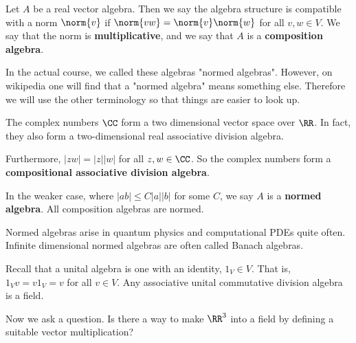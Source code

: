 \begin{defn}
    Let $A$ be a real vector algebra. Then we say the algebra structure is compatible with a norm $\norm{v}$ if  $\norm{vw}=\norm{v}\norm{w}$ for all $v,w\in V$. We say that the norm is \textbf{multiplicative}, and we say that $A$ is a \textbf{composition algebra}.
\end{defn}
\begin{remark*}
    In the actual course, we called these algebras "normed algebras". However, on wikipedia one will find that a "normed algebra" means something else. Therefore we will use the other terminology so that things are easier to look up.
\end{remark*}
\begin{example}
    The complex numbers $\CC$ form a two dimensional vector space over $\RR$. In fact, they also form a two-dimensional real associative division algebra.

    Furthermore, $|zw| = |z||w|$ for all $z,w\in \CC$. So the complex numbers form a \textbf{compositional associative division algebra}.
\end{example}
\begin{remark*}
    In the weaker case, where $|ab| \leq C|a||b|$ for some $C$, we say $A$ is a \textbf{normed algebra}. All composition algebras are normed.
\end{remark*}
\begin{physics*}
Normed algebras arise in quantum physics and computational PDEs quite often. Infinite dimensional normed algebras are often called Banach algebras.
\end{physics*}
\begin{remark*}
Recall that a unital algebra is one with an identity, $1_V \in V$. That is, $1_V v = v1_V = v$ for all $v\in V$.
Any associative unital commutative division algebra is a field.
\end{remark*}
Now we ask a question. Is there a way to make $\RR^3$ into a field by defining a suitable vector multiplication?

